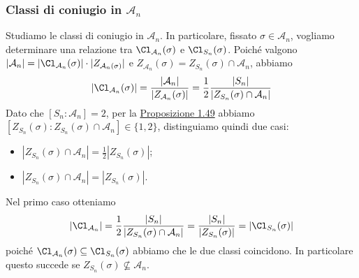 \documentclass[11pt]{scrartcl}
\begin{document}
\subsubsection{Classi di coniugio in $\mathcal{A}_n$}

Studiamo le classi di coniugio in $\mathcal{A}_n$. In particolare,
fissato $\sigma \in \mathcal{A}_n$, vogliamo determinare una relazione tra
$\Cl_{\mathcal{A}_n}(\sigma)$ e $\Cl_{S_n}(\sigma)$.
Poiché valgono $|\mathcal{A}_n| = |\Cl_{\mathcal{A}_n}(\sigma)|\cdot |Z_{\mathcal{A}_n(\sigma)}|$
e $Z_{\mathcal{A}_n}(\sigma) = Z_{S_n}(\sigma) \cap \mathcal{A}_n$, abbiamo
\[
    |\Cl_{\mathcal{A}_n}(\sigma)| = \frac{|\mathcal{A}_n|}{|Z_{\mathcal{A}_n}(\sigma)|} =
    \frac 1 2 \frac{|S_n|}{|Z_{S_n}(\sigma) \cap \mathcal{A}_n|}
\]
Dato che $[S_n:\mathcal{A}_n] = 2$, per la \hyperref[prop1.49]{Proposizione 1.49}
abbiamo $[Z_{S_n}(\sigma):Z_{S_n}(\sigma) \cap \mathcal{A}_n] \in \{1, 2\}$,
distinguiamo quindi due casi:
\begin{itemize}
    \item $|Z_{S_n}(\sigma) \cap \mathcal{A}_n| = \displaystyle\frac 1 2 |Z_{S_n}(\sigma)|$;
    \item $|Z_{S_n}(\sigma) \cap \mathcal{A}_n| = |Z_{S_n}(\sigma)|$.
\end{itemize}

Nel primo caso otteniamo 
\[
    |\Cl_{\mathcal{A}_n}| = \frac 1 2 \frac{|S_n|}{|Z_{S_n}(\sigma) \cap \mathcal{A}_n|} =
    \frac{|S_n|}{|Z_{S_n}(\sigma)|} = |\Cl_{S_n}(\sigma)|
\]
poiché $\Cl_{\mathcal{A}_n}(\sigma)\subseteq \Cl_{S_n}(\sigma)$ abbiamo che le
due classi coincidono. In particolare questo succede se $Z_{S_n}(\sigma)
\nsubseteq \mathcal{A}_n$.
\end{document}
